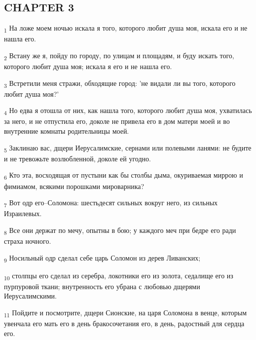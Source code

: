 \subsection{CHAPTER 3}
\begin{tcolorbox}
\textsubscript{1} На ложе моем ночью искала я того, которого любит душа моя, искала его и не нашла его.
\end{tcolorbox}
\begin{tcolorbox}
\textsubscript{2} Встану же я, пойду по городу, по улицам и площадям, и буду искать того, которого любит душа моя; искала я его и не нашла его.
\end{tcolorbox}
\begin{tcolorbox}
\textsubscript{3} Встретили меня стражи, обходящие город: 'не видали ли вы того, которого любит душа моя?'
\end{tcolorbox}
\begin{tcolorbox}
\textsubscript{4} Но едва я отошла от них, как нашла того, которого любит душа моя, ухватилась за него, и не отпустила его, доколе не привела его в дом матери моей и во внутренние комнаты родительницы моей.
\end{tcolorbox}
\begin{tcolorbox}
\textsubscript{5} Заклинаю вас, дщери Иерусалимские, сернами или полевыми ланями: не будите и не тревожьте возлюбленной, доколе ей угодно.
\end{tcolorbox}
\begin{tcolorbox}
\textsubscript{6} Кто эта, восходящая от пустыни как бы столбы дыма, окуриваемая миррою и фимиамом, всякими порошками мироварника?
\end{tcolorbox}
\begin{tcolorbox}
\textsubscript{7} Вот одр его--Соломона: шестьдесят сильных вокруг него, из сильных Израилевых.
\end{tcolorbox}
\begin{tcolorbox}
\textsubscript{8} Все они держат по мечу, опытны в бою; у каждого меч при бедре его ради страха ночного.
\end{tcolorbox}
\begin{tcolorbox}
\textsubscript{9} Носильный одр сделал себе царь Соломон из дерев Ливанских;
\end{tcolorbox}
\begin{tcolorbox}
\textsubscript{10} столпцы его сделал из серебра, локотники его из золота, седалище его из пурпуровой ткани; внутренность его убрана с любовью дщерями Иерусалимскими.
\end{tcolorbox}
\begin{tcolorbox}
\textsubscript{11} Пойдите и посмотрите, дщери Сионские, на царя Соломона в венце, которым увенчала его мать его в день бракосочетания его, в день, радостный для сердца его.
\end{tcolorbox}
